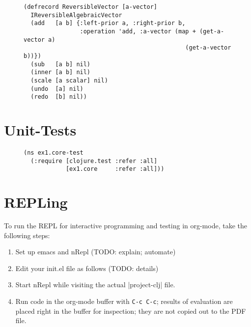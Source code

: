 \documentclass[11pt]{article}
\begin{document}
\begin{figure}[H]
\label{reversible-algebraic-vector-on-vector}
\begin{verbatim}
(defrecord ReversibleVector [a-vector]
  IReversibleAlgebraicVector
  (add   [a b] {:left-prior a, :right-prior b,
                :operation 'add, :a-vector (map + (get-a-vector a)
                                              (get-a-vector b))})
  (sub   [a b] nil)
  (inner [a b] nil)
  (scale [a scalar] nil)
  (undo  [a] nil)
  (redo  [b] nil))
\end{verbatim}
\end{figure}
\section{Unit-Tests}
\label{sec-5}

\begin{figure}[H]
\label{test-namespace}
\begin{verbatim}
(ns ex1.core-test
  (:require [clojure.test :refer :all]
            [ex1.core     :refer :all]))
\end{verbatim}
\end{figure}
\section{REPLing}
\label{sec-6}
\label{sec:emacs-repl}
To run the REPL for interactive programming and testing in org-mode,
take the following steps:
\begin{enumerate}
\item Set up emacs and nRepl (TODO: explain; automate)
\item Edit your init.el file as follows (TODO: details)
\item Start nRepl while visiting the actual |project-clj| file.
\item Run code in the org-mode buffer with \verb|C-c C-c|; results of
evaluation are placed right in the buffer for inspection; they are
not copied out to the PDF file.
\end{enumerate}
\end{document}
